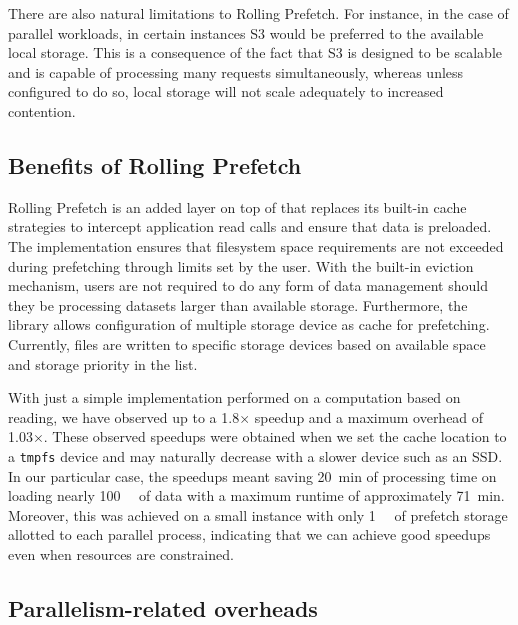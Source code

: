 \documentclass[conference]{IEEEtran}
\begin{document}
There are also natural limitations to
Rolling Prefetch. For instance, in the case of parallel workloads, in certain instances S3 would be
preferred to the available local storage. This is a consequence of the fact that S3 is designed to be scalable
and is capable of processing many requests simultaneously, whereas unless configured to do so, local storage
will not scale adequately to increased contention.


\subsection{Benefits of Rolling Prefetch}

Rolling Prefetch is an added layer on top of \sfs that replaces its built-in cache strategies to intercept
application read calls and ensure that data is preloaded. The implementation ensures that filesystem space requirements are not exceeded during prefetching through limits set by the user. 
With the built-in eviction mechanism, users are not required to do any form of data management should they be processing datasets larger than available storage. Furthermore, the library allows configuration of multiple storage device as cache for prefetching. Currently,
files are written to specific storage devices based on available space and storage priority in the list.

With just a simple implementation performed on a computation based on reading, we have observed up to a 1.8$\times$ speedup and a maximum overhead of 1.03$\times$. These observed speedups were
obtained when we set the cache location to a \texttt{tmpfs} device and may naturally decrease with a slower device such as an SSD. In our particular case, the speedups meant saving 20~min of processing time
on loading nearly \SI{100}{\gibi\byte} of data with a maximum runtime of approximately 71~min. Moreover, this
was achieved on a small instance with only \SI{1}{\gibi\byte} of prefetch storage allotted to each parallel
process, indicating that we can achieve good speedups even when resources are constrained. 

\subsection{Parallelism-related overheads}
\end{document}
